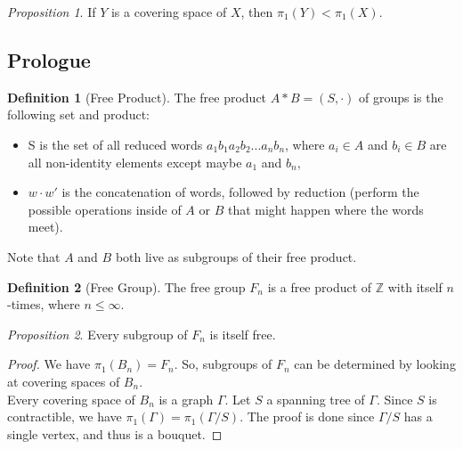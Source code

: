 \documentclass[11pt]{article}
\theoremstyle{definition}
\newtheorem{definition}{Definition}[section]
\theoremstyle{example}
\theoremstyle{remark}
\theoremstyle{lemma}
\theoremstyle{proposition}
\newtheorem{proposition}{Proposition}[section]
\theoremstyle{Problem}
\theoremstyle{Solution}
\theoremstyle{theorem}
\begin{document}
\begin{proposition}
If $Y$ is a covering space of $X$, then $\pi_1(Y) < \pi_1(X)$.
\end{proposition}

\subsection{Prologue}
\begin{definition}[Free Product]
The free product $A*B = (S, \cdot)$ of groups is the following set and product:
\begin{itemize}
\item S is the set of all reduced words $a_1b_1a_2b_2...a_nb_n$, where $a_i\in A$ and $b_i\in B$ are all non-identity elements except maybe $a_1$ and $b_n$,
\item $w\cdot w'$ is the concatenation of words, followed by reduction (perform the possible operations inside of $A$ or $B$ that might happen where the words meet).
\end{itemize}
Note that $A$ and $B$ both live as subgroups of their free product.
\end{definition}

\begin{definition}[Free Group]
The free group $F_n$ is a free product of $\mathbb{Z}$ with itself $n$-times, where $n\leq \infty$.
\end{definition}


\begin{proposition}
Every subgroup of $F_n$ is itself free.
\end{proposition}
\begin{proof}
We have $\pi_1(B_n) = F_n$. So, subgroups of $F_n$ can be determined by looking at covering spaces of $B_n$.\\
Every covering space of $B_n$ is a graph $\Gamma$. Let $S$ a spanning tree of $\Gamma$. Since $S$ is contractible, we have $\pi_1(\Gamma) = \pi_1(\Gamma/S)$. The proof is done since $\Gamma/S$ has a single vertex, and thus is a bouquet. 
\end{proof}
\end{document}
